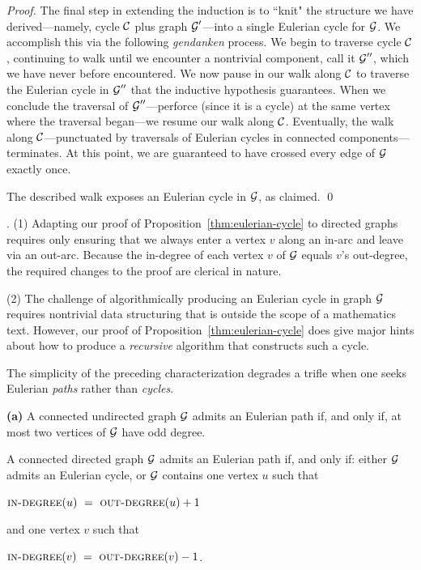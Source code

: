 \begin{proof}
\smallskip

The final step in extending the induction is to ``knit" the structure we have derived---namely, cycle $\mbox{$\cal C$}$ plus graph $\mbox{$\cal G$}'$---into a single Eulerian cycle for $\mbox{$\cal G$}$.  We accomplish this via the following {\em gendanken} process.  We begin to traverse cycle $\mbox{$\cal C$}$, continuing to walk until we encounter a nontrivial component, call it $\mbox{$\cal G$}''$, which we have never before encountered.  We now pause in our walk along $\mbox{$\cal C$}$ to traverse the Eulerian cycle in $\mbox{$\cal G$}''$ that the inductive hypothesis guarantees.  When we conclude the traversal of $\mbox{$\cal G$}''$---perforce (since it is a cycle) at the same vertex where the traversal began---we resume our walk along $\mbox{$\cal C$}$.  Eventually, the walk along $\mbox{$\cal C$}$---punctuated by traversals of Eulerian cycles in connected components---terminates.  At this point, we are guaranteed to have crossed every edge of $\mbox{$\cal G$}$ exactly once.

\medskip

The described walk exposes an Eulerian cycle in $\mbox{$\cal G$}$, as claimed.   \qed
\end{proof}

\medskip

.
(1) Adapting our proof of Proposition~\ref{thm:eulerian-cycle} to directed graphs requires only  ensuring that we always enter a vertex $v$ along an in-arc and leave via an out-arc.  Because the in-degree of each vertex $v$ of $\mbox{$\cal G$}$ equals $v$'s out-degree, the required changes to the proof are clerical in nature.

\noindent (2)
The challenge of algorithmically producing an Eulerian cycle in graph $\mbox{$\cal G$}$ requires nontrivial data structuring that is outside the scope of a mathematics text.  However, our proof of Proposition~\ref{thm:eulerian-cycle} does give major hints about how to produce a {\em recursive} algorithm that constructs such a cycle.

\bigskip

The simplicity of the preceding characterization degrades a trifle when
one seeks Eulerian {\em paths} rather than {\em cycles}.

\begin{prop}
\label{thm:eulerian-path}
{\bf (a)}
A connected undirected graph $\mbox{$\cal G$}$ admits an Eulerian path if, and only if, at most two vertices of $\mbox{$\cal G$}$ have odd degree.

\smallskip

A connected directed graph $\mbox{$\cal G$}$ admits an Eulerian path if, and only if: either $\mbox{$\cal G$}$ admits an 
Eulerian cycle, or $\mbox{$\cal G$}$ contains one vertex $u$ such that

\hspace*{.35in}$\mbox{\sc in-degree}(u) \ = \ \mbox{\sc out-degree}(u) +1$

\noindent
and one vertex $v$ such that

\hspace*{.35in}$\mbox{\sc in-degree}(v) \ = \ \mbox{\sc out-degree}(v) -1$.
\end{prop}

